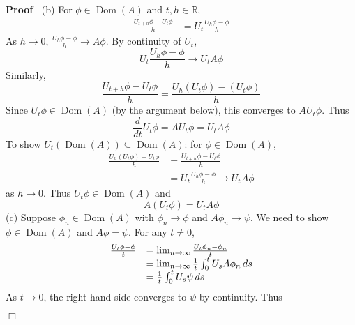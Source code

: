 \documentclass{article}
\newcommand{\tmop}[1]{\ensuremath{\operatorname{#1}}}
\newenvironment{proof}{\noindent\textbf{Proof\ }}{\hspace*{\fill}$\Box$\medskip}
\newcommand{\R}{\mathbb{R}}
\newcommand{\1}{\mathbbm{1}}
\newcommand{\Dom}{\tmop{Dom}}
\begin{document}
\begin{proof}
  (b) For $\phi \in \Dom (A)$ and $t, h \in \R$,
  \begin{equation}
    \begin{array}{ll}
      \frac{U_{t + h} \phi - U_t \phi}{h} & = U_t  \frac{U_h \phi - \phi}{h}
    \end{array}
  \end{equation}
  As $h \to 0$, $\frac{U_h \phi - \phi}{h} \to A \phi$. By continuity of
  $U_t$,
  \begin{equation}
    U_t  \frac{U_h \phi - \phi}{h} \to U_t A \phi
  \end{equation}
  Similarly,
  \begin{equation}
    \frac{U_{t + h} \phi - U_t \phi}{h} = \frac{U_h  (U_t \phi) - (U_t
    \phi)}{h}
  \end{equation}
  Since $U_t \phi \in \Dom (A)$ (by the argument below), this converges to
  $AU_t \phi$. Thus
  \begin{equation}
    \frac{d}{dt} U_t \phi = AU_t \phi = U_t A \phi
  \end{equation}
  To show $U_t (\Dom (A)) \subseteq \Dom (A)$: for $\phi \in \Dom (A)$,
  \begin{equation}
    \begin{array}{ll}
      \frac{U_h  (U_t \phi) - U_t \phi}{h} & = \frac{U_{t + h} \phi - U_t
      \phi}{h}\\
      & = U_t  \frac{U_h \phi - \phi}{h} \to U_t A \phi
    \end{array}
  \end{equation}
  as $h \to 0$. Thus $U_t \phi \in \Dom (A)$ and
  \begin{equation}
    A (U_t \phi) = U_t A \phi
  \end{equation}
  (c) Suppose $\phi_n \in \Dom (A)$ with $\phi_n \to \phi$ and $A \phi_n \to
  \psi$. We need to show $\phi \in \Dom (A)$ and $A \phi = \psi$. For any $t
  \neq 0$,
  \begin{equation}
    \begin{array}{ll}
      \frac{U_t \phi - \phi}{t} & = \lim_{n \to \infty}  \frac{U_t \phi_n -
      \phi_n}{t}\\
      & = \lim_{n \to \infty}  \frac{1}{t}  \int_0^t U_s A \phi_n 
      \hspace{0.17em} ds\\
      & = \frac{1}{t}  \int_0^t U_s \psi \hspace{0.17em} ds
    \end{array}
  \end{equation}
  As $t \to 0$, the right-hand side converges to $\psi$ by continuity. Thus

\end{proof}
\end{document}
